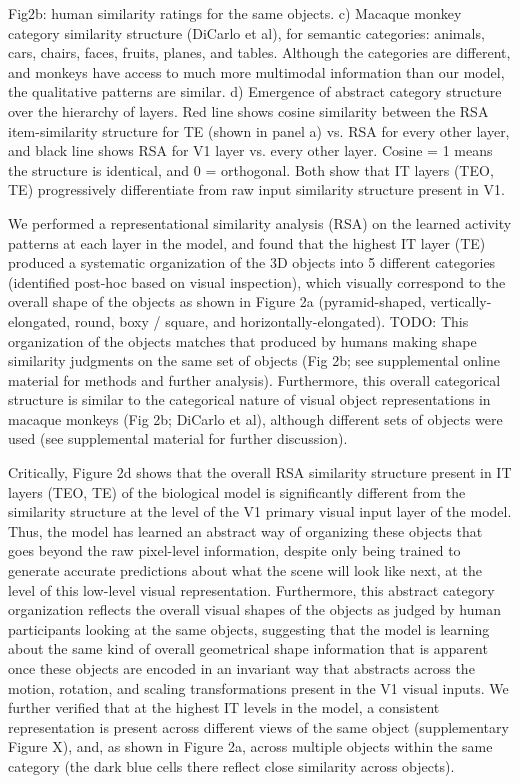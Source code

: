 \documentclass[11pt,twoside]{article}
\newif\myifpdf
\begin{document}
Fig2b: human similarity ratings for the same objects.
c) Macaque monkey category similarity structure (DiCarlo et al), for semantic categories: animals, cars, chairs, faces, fruits, planes, and tables. Although the categories are different, and monkeys have access to much more multimodal information than our model, the qualitative patterns are similar.
d) Emergence of abstract category structure over the hierarchy of layers.  Red line shows cosine similarity between the RSA item-similarity structure for TE (shown in panel a) vs. RSA for every other layer, and black line shows RSA for V1 layer vs. every other layer.  Cosine = 1 means the structure is identical, and 0 = orthogonal. Both show that IT layers (TEO, TE) progressively differentiate from raw input similarity structure present in V1.

We performed a representational similarity analysis (RSA) on the learned activity patterns at each layer in the model, and found that the highest IT layer (TE) produced a systematic organization of the 3D objects into 5 different categories (identified post-hoc based on visual inspection), which visually correspond to the overall shape of the objects as shown in Figure 2a (pyramid-shaped, vertically-elongated, round, boxy / square, and horizontally-elongated). TODO: This organization of the objects matches that produced by humans making shape similarity judgments on the same set of objects (Fig 2b; see supplemental online material for methods and further analysis).  Furthermore, this overall categorical structure is similar to the categorical nature of visual object representations in macaque monkeys (Fig 2b; DiCarlo et al), although different sets of objects were used (see supplemental material for further discussion).

Critically, Figure 2d shows that the overall RSA similarity structure present in IT layers (TEO, TE) of the biological model is significantly different from the similarity structure at the level of the V1 primary visual input layer of the model.  Thus, the model has learned an abstract way of organizing these objects that goes beyond the raw pixel-level information, despite only being trained to generate accurate predictions about what the scene will look like next, at the level of this low-level visual representation.  Furthermore, this abstract category organization reflects the overall visual shapes of the objects as judged by human participants looking at the same objects, suggesting that the model is learning about the same kind of overall geometrical shape information that is apparent once these objects are encoded in an invariant way that abstracts across the motion, rotation, and scaling transformations present in the V1 visual inputs.  We further verified that at the highest IT levels in the model, a consistent representation is present across different views of the same object (supplementary Figure X), and, as shown in Figure 2a, across multiple objects within the same category (the dark blue cells there reflect close similarity across objects).
\end{document}
